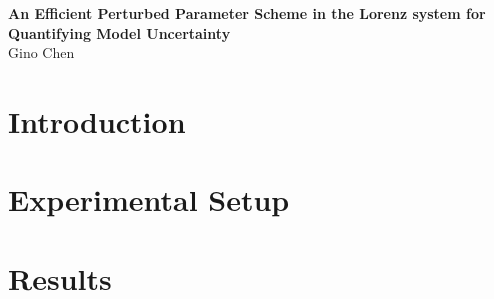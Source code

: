 \documentclass[times]{qjrms4}
\begin{document}
\newcommand{\bcite}{\color{black}\citep}  

\begin{flushleft}
 {\bf{An Efficient Perturbed Parameter Scheme in the Lorenz system for Quantifying Model Uncertainty}} \\
 Gino Chen
\end{flushleft}


%	



\section{Introduction} 
	
\section{Experimental Setup}\label{sec:expsetup}
	
%	
%	
%	
%		
\section{Results} \label{sec:skills}
			
\end{document}
